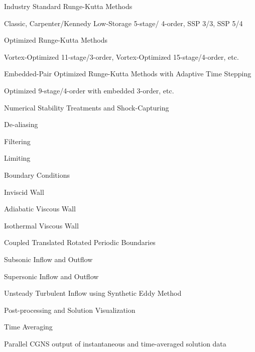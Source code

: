 \begin{overview}
\begin{overview}
    \item Industry Standard Runge-Kutta Methods
      \begin{overview}
        \item Classic, Carpenter\slash Kennedy Low-Storage 5-stage\slash
          4\supth-order, SSP 3\slash3, SSP 5\slash4
      \end{overview}
    \item Optimized Runge-Kutta Methods\cite{AlJahdali_2022}
      \begin{overview}
        \item Vortex-Optimized 11-stage\slash 3\suprd-order, Vortex-Optimized
          15-stage\slash 4\supth-order, etc.
      \end{overview}
    \item Embedded-Pair Optimized Runge-Kutta Methods with Adaptive
      Time Stepping\cite{Ranocha_2022}
      \begin{overview}
        \item Optimized 9-stage\slash 4\supth-order with embedded 3\suprd-order,
          etc.
      \end{overview}
  \end{overview}
\item Numerical Stability Treatments and Shock-Capturing
  \begin{overview}
    \item De-aliasing
    \item Filtering
    \item Limiting
  \end{overview}
\item Boundary Conditions
  \begin{overview}
  \item Inviscid Wall
  \item Adiabatic Viscous Wall
  \item Isothermal Viscous Wall
  \item Coupled Translated \andor Rotated Periodic Boundaries
  \item Subsonic Inflow and Outflow
  \item Supersonic Inflow and Outflow
  \item Unsteady Turbulent Inflow using Synthetic Eddy Method
  \end{overview}
\item Post-processing and Solution Visualization
  \item Time Averaging
  \begin{overview}
    \item Parallel CGNS output of instantaneous and time-averaged solution data

\end{overview}
\end{overview}
